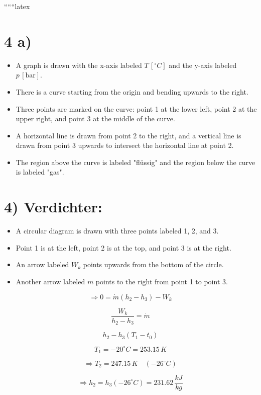 
``````latex


\section*{4 a)}

\begin{itemize}
    \item A graph is drawn with the x-axis labeled $T \, [^\circ C]$ and the y-axis labeled $p \, [\text{bar}]$.
    \item There is a curve starting from the origin and bending upwards to the right.
    \item Three points are marked on the curve: point 1 at the lower left, point 2 at the upper right, and point 3 at the middle of the curve.
    \item A horizontal line is drawn from point 2 to the right, and a vertical line is drawn from point 3 upwards to intersect the horizontal line at point 2.
    \item The region above the curve is labeled "flüssig" and the region below the curve is labeled "gas".
\end{itemize}

\section*{4) Verdichter:}

\begin{itemize}
    \item A circular diagram is drawn with three points labeled 1, 2, and 3.
    \item Point 1 is at the left, point 2 is at the top, and point 3 is at the right.
    \item An arrow labeled $W_k$ points upwards from the bottom of the circle.
    \item Another arrow labeled $m$ points to the right from point 1 to point 3.
\end{itemize}

\[
\Rightarrow 0 = \dot{m} (h_2 - h_3) - W_k
\]

\[
\frac{W_k}{h_2 - h_3} = \dot{m}
\]

\[
h_2 - h_3 (T_1 - t_0)
\]

\[
T_1 = -20^\circ C = 253.15 \, K
\]

\[
\Rightarrow T_2 = 247.15 \, K \quad (-26^\circ C)
\]

\[
\Rightarrow h_2 = h_3 (-26^\circ C) = 231.62 \, \frac{kJ}{kg}
\]

